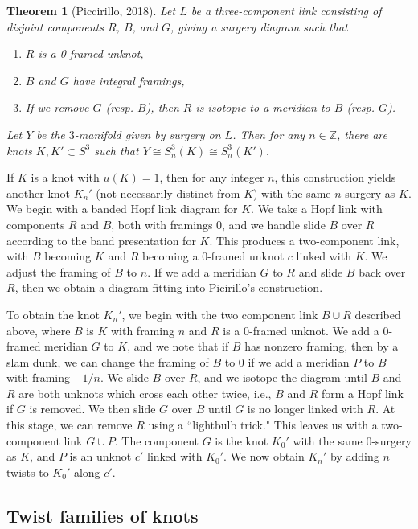 \documentclass[11pt,usenames,dvipsnames,reqno]{amsart}
\newtheorem{theorem}{Theorem}
\numberwithin{theorem}{section}
\theoremstyle{ex}
\theoremstyle{rem}
\begin{document}
\begin{theorem}[Piccirillo, 2018]
	Let $L$ be a three-component link consisting of disjoint components $R$, $B$, and $G$, giving a surgery diagram such that
	\begin{enumerate}[label=\normalfont (\alph*)]
		\item $R$ is a 0-framed unknot,
		\item $B$ and $G$ have integral framings,
		\item If we remove $G$ (resp. $B$), then $R$ is isotopic to a meridian to $B$ (resp. $G$).
	\end{enumerate}
	Let $Y$ be the $3$-manifold given by surgery on $L$. Then for any $n\in\mathbb{Z}$, there are knots $K,K'\subset S^3$ such that $Y\cong S_n^3(K)\cong S_n^3(K')$.

\end{theorem}

If $K$ is a knot with $u(K)=1$, then for any integer $n$, this construction yields another knot $K_n'$ (not necessarily distinct from $K$) with the same $n$-surgery as $K$. We begin with a banded Hopf link diagram for $K$. We take a Hopf link with components $R$ and $B$, both with framings 0, and we handle slide $B$ over $R$ according to the band presentation for $K$. This produces a two-component link, with $B$ becoming $K$ and $R$ becoming a 0-framed unknot $c$ linked with $K$. We adjust the framing of $B$ to $n$. If we add a meridian $G$ to $R$ and slide $B$ back over $R$, then we obtain a diagram fitting into Picirillo's construction.

To obtain the knot $K_n'$, we begin with the two component link $B\cup R$ described above, where $B$ is $K$ with framing $n$ and $R$ is a 0-framed unknot. We add a 0-framed meridian $G$ to $K$, and we note that if $B$ has nonzero framing, then by a slam dunk, we can change the framing of $B$ to 0 if we add a meridian $P$ to $B$ with framing $-1/n$. We slide $B$ over $R$, and we isotope the diagram until $B$ and $R$ are both unknots which cross each other twice, i.e., $B$ and $R$ form a Hopf link if $G$ is removed. We then slide $G$ over $B$ until $G$ is no longer linked with $R$. At this stage, we can remove $R$ using a ``lightbulb trick." This leaves us with a two-component link $G\cup P$. The component $G$ is the knot $K_0'$ with the same 0-surgery as $K$, and $P$ is an unknot $c'$ linked with $K_0'$. We now obtain $K_n'$ by adding $n$ twists to $K_0'$ along $c'$.


\subsection{Twist families of knots}
\end{document}
